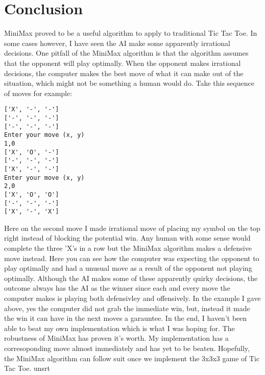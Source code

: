 \documentclass[letterpaper]{article}
\begin{document}
\section {Conclusion}
MiniMax proved to be a useful algorithm to apply to traditional Tic Tac Toe. In some cases however, I have seen the AI make some apparently irrational decisions. One pitfall of the MiniMax algorithm is that the algorithm assumes that the opponent will play optimally. When the opponent makes irrational decisions, the computer makes the best move of what it can make out of the situation, which might not be something a human would do. Take this sequence of moves for example:
\begin{lstlisting}
['X', '-', '-']
['-', '-', '-']
['-', '-', '-']
Enter your move (x, y)
1,0
['X', 'O', '-']
['-', '-', '-']
['X', '-', '-']
Enter your move (x, y)
2,0
['X', 'O', 'O']
['-', '-', '-']
['X', '-', 'X']  
\end{lstlisting}
Here on the second move I made irrational move of placing my symbol on the top right instead of blocking the potential win. Any human with some sense would complete the three 'X's in a row but the MiniMax algorithm makes a defensive move instead. Here you can see how the computer was expecting the opponent to play optimally and had a unusual move as a result of the opponent not playing optimally. Although the AI makes some of these apparently quirky decisions, the outcome always has the AI as the winner since each and every move the computer makes is playing both defensivley and offensively. In the example I gave above, yes the computer did not grab the immediate win, but, instead it made the win it can have in the next moves a garauntee. In the end, I haven't been able to beat my own implementation which is what I was hoping for. The robustness of MiniMax has proven it's worth. My implementation has a corresoponding move almost immediately and has yet to be beaten. Hopefully, the MiniMax algorithm can follow suit once we implement the 3x3x3 game of Tic Tac Toe.
 {unsrt}

\end{document}

